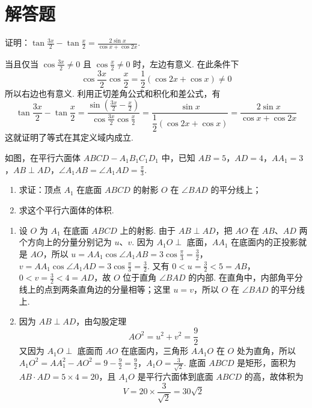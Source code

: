 \section{解答题}

\begin{problem}
证明：\(\tan \frac{3x}{2} - \tan \frac{x}{2} = \frac{2\sin x}{\cos x + \cos 2x}\).
\end{problem}

\begin{solution}
当且仅当 \(\cos\frac{3x}{2}\neq0\) 且 \(\cos\frac{x}{2}\neq0\) 时，左边有意义. 在此条件下
\[
\cos\frac{3x}{2}\cos\frac{x}{2}
=\frac12\left(\cos 2x+\cos x\right)\neq0
\]
所以右边也有意义. 利用正切差角公式和积化和差公式，有
\[
\tan \frac{3x}{2} - \tan \frac{x}{2} = \frac{\sin\left(\frac{3x}{2}-\frac{x}{2}\right)}{\cos\frac{3x}{2}\cos\frac{x}{2}} = \frac{\sin x}{\dfrac{1}{2}\left(\cos 2x+\cos x\right)} = \frac{2\sin x}{\cos x+\cos 2x}
\]
这就证明了等式在其定义域内成立.
\end{solution}

\begin{problem}
如图，在平行六面体 \(ABCD - A_1B_1C_1D_1\) 中，已知 \(AB = 5\)，\(AD = 4\)，\(AA_1 = 3\)，\(AB \perp AD\)，\(\angle A_1AB = \angle A_1AD = \frac{\pi}{3}\).
\begin{enumerate}
\item 求证：顶点 \(A_1\) 在底面 \(ABCD\) 的射影 \(O\) 在 \(\angle BAD\) 的平分线上；
\item 求这个平行六面体的体积.
\end{enumerate}

\end{problem}

\begin{solution}
\begin{enumerate}
\item 设 \(O\) 为 \(A_1\) 在底面 \(ABCD\) 上的射影. 由于 \(AB\perp AD\)，把 \(AO\) 在 \(AB\)、\(AD\) 两个方向上的分量分别记为 \(u\)、\(v\). 因为 \(A_1O\perp\) 底面，\(AA_1\) 在底面内的正投影就是 \(AO\)，所以
\(u=AA_1\cos\angle A_1AB=3\cos\frac{\pi}{3}=\frac{3}{2}\)，\(v=AA_1\cos\angle A_1AD=3\cos\frac{\pi}{3}=\frac{3}{2}\).
又有 \(0<u=\frac32<5=AB\)，\(0<v=\frac32<4=AD\)，故 \(O\) 位于直角 \(\angle BAD\) 的内部. 在直角中，内部角平分线上的点到两条直角边的分量相等；这里 \(u=v\)，所以 \(O\) 在 \(\angle BAD\) 的平分线上.

\item 因为 \(AB\perp AD\)，由勾股定理
\[
AO^2=u^2+v^2=\frac{9}{2}
\]
又因为 \(A_1O\perp\) 底面而 \(AO\) 在底面内，三角形 \(AA_1O\) 在 \(O\) 处为直角，所以
\(A_1O^2=AA_1^2-AO^2=9-\frac{9}{2}=\frac{9}{2}\)，\(A_1O=\frac{3}{\sqrt{2}}\).
底面 \(ABCD\) 是矩形，面积为 \(AB\cdot AD=5\times4=20\)，且 \(A_1O\) 是平行六面体到底面 \(ABCD\) 的高，故体积为
\[
V=20\times\frac{3}{\sqrt{2}}=30\sqrt{2}
\]
\end{enumerate}
\end{solution}

